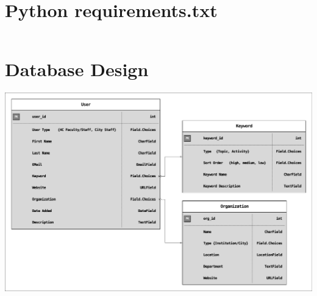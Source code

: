 \documentclass[11pt, hidelinks, letterpaper, obeyspaces]{article}
\begin{document}
\section{Python requirements.txt}
\label{sec:requirements.txt}
\inputminted[linenos,frame=single,framesep=10pt]{text}{requirements.txt}
\section{Database Design}
\label{sec:database-design}
\includegraphics[width=\textwidth,trim=4 4 4 4,clip]{database-design.pdf}
\newpage
\end{document}
